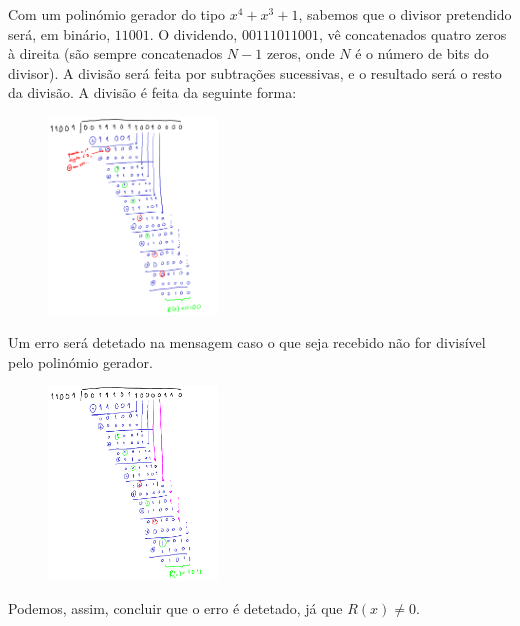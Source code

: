 
\begin{enumerate}[leftmargin=\labelsep]

        Com um polinómio gerador do tipo $x^4 + x^3 + 1$, sabemos que o divisor pretendido
        será, em binário, $11001$. O dividendo, $00111011001$, vê concatenados quatro zeros
        à direita (são sempre concatenados $N - 1$ zeros, onde $N$ é o número de bits do
        divisor). A divisão será feita por subtrações sucessivas, e o resultado será o resto
        da divisão. A divisão é feita da seguinte forma:

        \begin{figure}[H]
          \centering
          \includegraphics[width=0.4\textwidth]{assets/014a.png}
        \end{figure}


        Um erro será detetado na mensagem caso o que seja recebido não for divisível pelo
        polinómio gerador.

        \begin{figure}[H]
          \centering
          \includegraphics[width=0.4\textwidth]{assets/014b.png}
        \end{figure}

        Podemos, assim, concluir que o erro é detetado, já que $R(x) \neq 0$.
\end{enumerate}